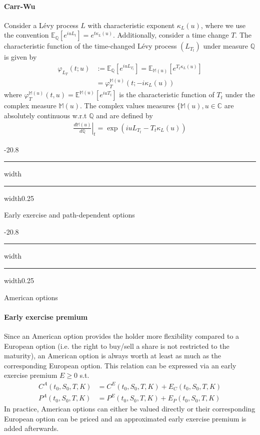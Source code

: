 \documentclass[a4paper,landscape,7pt,fleqn]{scrartcl}
\makeatletter
\renewcommand{\section}{\@startsection{section}{1}{0mm}%
{-2\baselineskip}{0.8\baselineskip}%
{\hrule depth 0.2pt width\columnwidth\hrule depth1.5pt
width0.25\columnwidth\vspace*{1.2em}\Large\bfseries}}
\renewcommand{\subsection}{\@startsection{subsection}{1}{0mm}%
{-2\baselineskip}{0.8\baselineskip}%
{\hrule depth 0.2pt width\columnwidth\hrule depth0.75pt
width0.25\columnwidth\vspace*{1.2em}\large\bfseries}}
\makeatother
\begin{document}
\begin{multicols*}{3}
\paragraph{Carr-Wu}
Consider a Lévy process $L$ with characteristic exponent $\kappa_L(u)$, where we use the convention $\mathbb{E}_\mathbb{Q}\left[ e^{i u L_t} \right] = e^{t \kappa_L(u)}$. Additionally, consider a time change $T$. The characteristic function of the time-changed Lévy process $(L_{T_t})$ under measure $\mathbb{Q}$ is given by
\begin{align*}
\varphi_{L_T}(t;u) &:= \mathbb{E}_\mathbb{Q} \left[ e^{i u L_{T_t}} \right] = \mathbb{E}_{\mathbb{M}(u)} \left[ e^{T_t \kappa_L(u)} \right] \\
&= \varphi_T^{\mathbb{M}(u)}(t;-i \kappa_L(u))
\end{align*}
where $\varphi_T^{\mathbb{M}(u)}(t,u) = \mathbb{E}^{\mathbb{M}(u)} \left[ e^{i u T_t} \right]$ is the characteristic function of $T_t$ under the complex measure $\mathbb{M}(u)$. The complex values measures $\lbrace \mathbb{M}(u), u \in \mathbb{C}$ are absolutely continuous w.r.t $\mathbb{Q}$ and are defined by
\begin{align*}
\left. \frac{d \mathbb{M}(u)}{d \mathbb{Q}} \right\vert_t = \exp (i u L_{T_t} - T_t \kappa_L(u))
\end{align*}

\columnbreak

\section{Early exercise and path-dependent options}

\subsection{American options}

\paragraph{Early exercise premium}
Since an American option provides the holder more flexibility compared to a European option (i.e. the right to buy/sell a share is not restricted to the maturity), an American option is always worth at least as much as the corresponding European option. This relation can be expressed via an early exercise premium $E \geq 0$ s.t.
\begin{align*}
C^A(t_0, S_0, T, K) &= C^E (t_0, S_0, T, K) + E_C (t_0, S_0, T, K) \\
P^A(t_0, S_0, T, K) &= P^E (t_0, S_0, T, K) + E_P (t_0, S_0, T, K)
\end{align*}
In practice, American options can either be valued directly or their corresponding European option can be priced and an approximated early exercise premium is added afterwards.


\end{multicols*}
\end{document}
